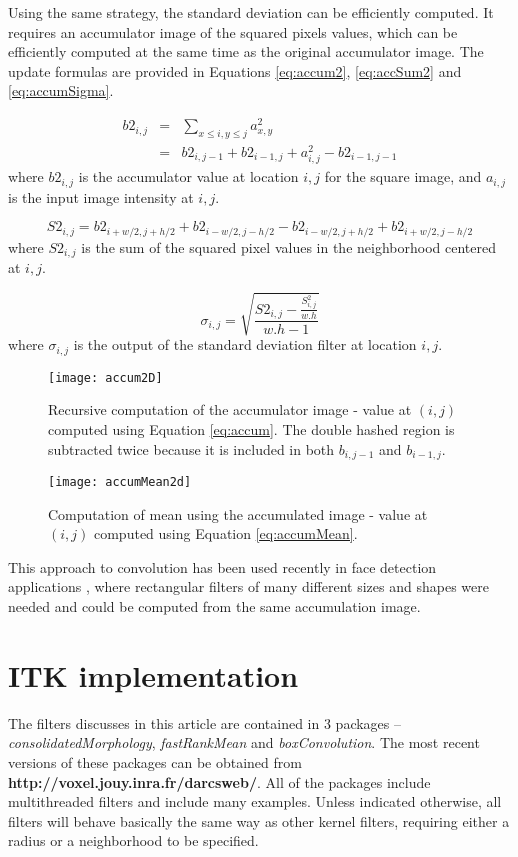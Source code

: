 \documentclass{InsightArticle}
\begin{document}
Using the same strategy, the standard deviation can be efficiently
computed.  It requires an accumulator image of the squared pixels
values, which can be efficiently computed at the same time as the
original accumulator image. The update formulas are provided in
Equations \ref{eq:accum2}, \ref{eq:accSum2} and \ref{eq:accumSigma}.

\begin{eqnarray}
\label{eq:accum2}
b2_{i,j} & = & \sum_{x \leq i, y \leq j} a_{x,y}^2 \\ \nonumber
	& = & b2_{i,j-1} + b2_{i-1, j} + a_{i,j}^2 - b2_{i-1, j-1}
\end{eqnarray}
where $b2_{i,j}$ is the accumulator value at location $i,j$ for the square image, and $a_{i,j}$ is the input image intensity at $i,j$.

\begin{equation}
\label{eq:accSum2}
S2_{i,j} = b2_{i+w/2,j+h/2} + b2_{i-w/2,j-h/2} - b2_{i-w/2,j+h/2} + b2_{i+w/2,j-h/2}
\end{equation}
where $S2_{i,j}$ is the sum of the squared pixel values in the neighborhood centered at $i,j$.

\begin{equation}
\label{eq:accumSigma}
\sigma_{i,j} = \sqrt{\frac{S2_{i,j} - \frac{S_{i,j}^2}{w.h}}{w.h-1}}
\end{equation}
where $\sigma_{i,j}$ is the output of the standard deviation filter at location $i,j$.

\begin{figure}[htbp]
\centering
\texttt{[image: accum2D]}
\caption{Recursive computation of the accumulator image - value at $(i,j)$ computed using Equation \ref{eq:accum}. The double hashed region is subtracted twice because it is included in both $b_{i,j-1}$ and $b_{i-1, j}$.\label{fig:accum}}
\end{figure}

\begin{figure}[htbp]
\centering
\texttt{[image: accumMean2d]}
\caption{Computation of mean using the accumulated image - value at $(i,j)$ computed using Equation \ref{eq:accumMean}.\label{fig:accumMean}}
\end{figure}

This approach to convolution has been used recently in face detection
applications \cite{Viola2004}, where rectangular filters of many
different sizes and shapes were needed and could be computed from the same accumulation image.

\section{ITK implementation}
The filters discusses in this article are contained in 3 packages --
{\em consolidatedMorphology}, {\em fastRankMean} and {\em
boxConvolution}. The most recent versions of these packages can be
obtained from {\bf http://voxel.jouy.inra.fr/darcsweb/}. All of the packages
include multithreaded filters and include many examples. Unless
indicated otherwise, all filters will behave basically the same way as
other kernel filters, requiring either a radius or a neighborhood to
be specified.
\end{document}
